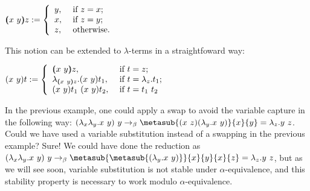$(\!\!(x\ y)\!\!) z := \left\{ \begin{array}{ll}
y, & \mbox{ if } z = x; \\
x, & \mbox{ if } z = y; \\
z, & \mbox{ otherwise. } \\
\end{array}\right.$


This notion can be extended to $\lambda$-terms in a straightfoward way:


$\swap{x}{y}{t} := \left\{ \begin{array}{ll}
\vswap{x}{y}{z}, & \mbox{ if } t = z; \\
\lambda_{\vswap{x}{y}{z}}.\swap{x}{y}{t_1}, & \mbox{ if } t = \lambda_z.t_1; \\
\swap{x}{y}{t_1}\ \swap{x}{y}{t_2}, & \mbox{ if } t = t_1\ t_2\\
\end{array}\right.$


In the previous example, one could apply a swap to avoid the variable capture in the following way: $(\lambda_x\lambda_y.x\ y)\ y \to_{\beta} \metasub{\swap{x}{z}{(\lambda_y.x\ y)}}{x}{y} = \lambda_z.y\ z$. Could we have used a variable substitution instead of a swapping in the previous example? Sure! We could have done the reduction as $(\lambda_x\lambda_y.x\ y)\ y \to_{\beta} \metasub{\metasub{(\lambda_y.x\ y)}}{x}{y}{x}{z} = \lambda_z.y\ z$, but as we will see soon, variable substitution is not stable under $\alpha$-equivalence, and this stability property is necessary to work modulo $\alpha$-equivalence.


